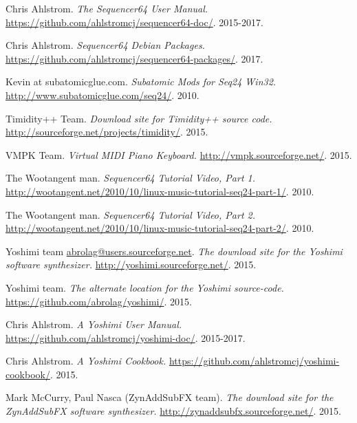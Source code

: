 \begin{thebibliography}{99}
   Chris Ahlstrom.
   \emph{The Sequencer64 User Manual.}
   \url{https://github.com/ahlstromcj/sequencer64-doc/}.
   2015-2017.

   Chris Ahlstrom.
   \emph{Sequencer64 Debian Packages.}
   \url{https://github.com/ahlstromcj/sequencer64-packages/}.
   2017.

   Kevin at subatomicglue.com.
   \emph{Subatomic Mods for Seq24 Win32.}
   \url{http://www.subatomicglue.com/seq24/}.
   2010.

   Timidity++ Team.
   \emph{Download site for Timidity++ source code.}
   \url{http://sourceforge.net/projects/timidity/}.
   2015.

   VMPK Team.
   \emph{Virtual MIDI Piano Keyboard.}
   \url{http://vmpk.sourceforge.net/}.
   2015.

   The Wootangent man.
   \emph{Sequencer64 Tutorial Video, Part 1.}
   \url{http://wootangent.net/2010/10/linux-music-tutorial-seq24-part-1/}.
   2010.

   The Wootangent man.
   \emph{Sequencer64 Tutorial Video, Part 2.}
   \url{http://wootangent.net/2010/10/linux-music-tutorial-seq24-part-2/}.
   2010.

   Yoshimi team \url{abrolag@users.sourceforge.net}.
   \emph{The download site for the Yoshimi software synthesizer.}
   \url{http://yoshimi.sourceforge.net/}.
   2015.

   Yoshimi team.
   \emph{The alternate location for the Yoshimi source-code.}
   \url{https://github.com/abrolag/yoshimi/}.
   2015.

   Chris Ahlstrom.
   \emph{A Yoshimi User Manual.}
   \url{https://github.com/ahlstromcj/yoshimi-doc/}.
   2015-2017.

   Chris Ahlstrom.
   \emph{A Yoshimi Cookbook.}
   \url{https://github.com/ahlstromcj/yoshimi-cookbook/}.
   2015.

   Mark McCurry, Paul Nasca (ZynAddSubFX team).
   \emph{The download site for the ZynAddSubFX software synthesizer.}
   \url{http://zynaddsubfx.sourceforge.net/}.
   2015.

\end{thebibliography}

